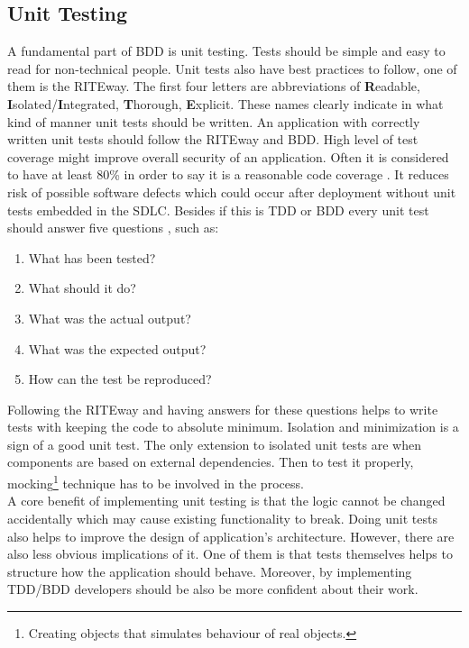 \documentclass{article} %
\begin{document}
\subsection{Unit Testing}
A fundamental part of BDD is unit testing. Tests should be simple and easy to read for non-technical people. Unit tests also have best practices to follow, one of them is the RITEway\cite{bib:riteway}. The first four letters are abbreviations of \textbf{R}eadable, \textbf{I}solated/\textbf{I}ntegrated, \textbf{T}horough, \textbf{E}xplicit. These names clearly indicate in what kind of manner unit tests should be written. An application with correctly written unit tests should follow the RITEway and BDD. High level of test coverage might improve overall security of an application. Often it is considered to have at least 80\% in order to say it is a reasonable code coverage \cite{bib:efficient_code_coverage}. It reduces risk of possible software defects which could occur after deployment without unit tests embedded in the SDLC.
\newline
Besides if this is TDD or BDD every unit test should answer five questions \cite{bib:unit_test_questions}, such as:
\begin{enumerate}
    \item What has been tested?
    \item What should it do?
    \item What was the actual output?
    \item What was the expected output?
    \item How can the test be reproduced?
\end{enumerate}
Following the RITEway and having answers for these questions helps to write tests with keeping the code to absolute minimum. Isolation and minimization is a sign of a good unit test. The only extension to isolated unit tests are when components are based on external dependencies. Then to test it properly, mocking\footnote{Creating objects that simulates behaviour of real objects.} technique has to be involved in the process.\\
\newline
A core benefit of implementing unit testing is that the logic cannot be changed accidentally which may cause existing functionality to break. Doing unit tests also helps to improve the design of application's architecture. However, there are also less obvious implications of it. One of them is that tests themselves helps to structure how the application should behave. Moreover, by implementing TDD/BDD developers should be also be more confident about their work.
\end{document}
